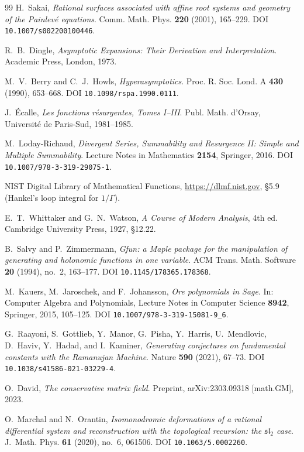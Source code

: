 \documentclass[11pt,reqno]{amsart}
\theoremstyle{plain}
\theoremstyle{definition}
\begin{document}
\begin{thebibliography}{99}
H.~Sakai,
\emph{Rational surfaces associated with affine root systems and geometry of the Painlev\'e
equations}.
Comm. Math. Phys. \textbf{220} (2001), 165--229.
DOI \texttt{10.1007/s002200100446}.

R.~B.~Dingle,
\emph{Asymptotic Expansions: Their Derivation and Interpretation}.
Academic Press, London, 1973.

M.~V.~Berry and C.~J.~Howls,
\emph{Hyperasymptotics}.
Proc. R. Soc. Lond. A \textbf{430} (1990), 653--668.
DOI \texttt{10.1098/rspa.1990.0111}.

J.~\'Ecalle,
\emph{Les fonctions r\'esurgentes, Tomes I--III}.
Publ. Math. d'Orsay, Universit\'e de Paris-Sud, 1981--1985.

M.~Loday-Richaud,
\emph{Divergent Series, Summability and Resurgence II: Simple and Multiple Summability}.
Lecture Notes in Mathematics \textbf{2154}, Springer, 2016.
DOI \texttt{10.1007/978-3-319-29075-1}.

NIST Digital Library of Mathematical Functions, \url{https://dlmf.nist.gov}, \S5.9
(Hankel's loop integral for $1/\Gamma$).

E.~T.~Whittaker and G.~N.~Watson,
\emph{A Course of Modern Analysis}, 4th ed.
Cambridge University Press, 1927, \S12.22.

B.~Salvy and P.~Zimmermann,
\emph{Gfun: a Maple package for the manipulation of generating and holonomic functions in one
variable}.
ACM Trans. Math. Software \textbf{20} (1994), no.~2, 163--177.
DOI \texttt{10.1145/178365.178368}.

M.~Kauers, M.~Jaroschek, and F.~Johansson,
\emph{Ore polynomials in Sage}.
In: Computer Algebra and Polynomials, Lecture Notes in Computer Science \textbf{8942},
Springer, 2015, 105--125.
DOI \texttt{10.1007/978-3-319-15081-9\_6}.

G.~Raayoni, S.~Gottlieb, Y.~Manor, G.~Pisha, Y.~Harris, U.~Mendlovic, D.~Haviv, Y.~Hadad, and
I.~Kaminer,
\emph{Generating conjectures on fundamental constants with the Ramanujan Machine}.
Nature \textbf{590} (2021), 67--73.
DOI \texttt{10.1038/s41586-021-03229-4}.

O.~David,
\emph{The conservative matrix field}.
Preprint, arXiv:2303.09318 [math.GM], 2023.

O.~Marchal and N.~Orantin,
\emph{Isomonodromic deformations of a rational differential system and reconstruction with the
topological recursion: the $\mathfrak{sl}_2$ case}.
J.~Math. Phys. \textbf{61} (2020), no.~6, 061506.
DOI \texttt{10.1063/5.0002260}.


\end{thebibliography}
\end{document}
